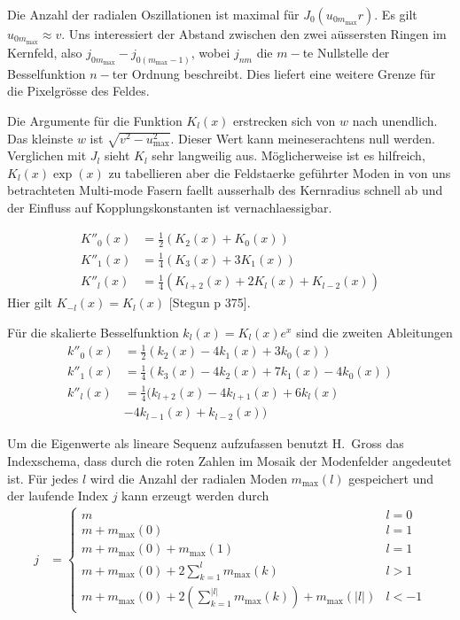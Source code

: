 \documentclass[DIV19,twocolumn]{scrartcl}
\def\({\left(}
\def\){\right)}
\newcommand{\mmax}{m_\textrm{max}}
\newcommand{\umax}{u_\textrm{max}}
\begin{document}
Die Anzahl der radialen Oszillationen ist maximal f\"ur $J_0(u_{0
  m_\textrm{max}} r)$.  Es gilt $u_{0 m_\textrm{max}} \approx v$. Uns
interessiert der Abstand zwischen den zwei a\"ussersten Ringen im
Kernfeld, also $j_{0m_\textrm{max}} - j_{0 (m_\textrm{max}-1)}$, wobei
$j_{nm}$ die $m-$te Nullstelle der Besselfunktion $n-$ter Ordnung
beschreibt.  Dies liefert eine weitere Grenze f\"ur die Pixelgr\"osse
des Feldes.

Die Argumente f\"ur die Funktion $K_l(x)$ erstrecken sich von $w$ nach
unendlich. Das kleinste $w$ ist $\sqrt{v^2-\umax^2}$. Dieser Wert kann
meineserachtens null werden. Verglichen mit $J_l$ sieht $K_l$ sehr
langweilig aus. M\"oglicherweise ist es hilfreich, $K_l(x)\exp(x)$ zu
tabellieren aber die Feldstaerke gef\"uhrter Moden in von uns
betrachteten Multi-mode Fasern faellt ausserhalb des Kernradius
schnell ab und der Einfluss auf Kopplungskonstanten ist
vernachlaessigbar.


\begin{align}
  K''_0(x) &= \frac{1}{2}\(K_2(x)+K_0(x)\)\\
  K''_1(x) &= \frac{1}{4}\(K_3(x)+3K_1(x)\)\\
  K''_l(x) &= \frac{1}{4}\(K_{l+2}(x)+2K_l(x)+K_{l-2}(x)\)
\end{align}
Hier gilt $K_{-l}(x) = K_l(x)$ [Stegun p 375]. 

F\"ur die skalierte Besselfunktion $k_l(x)=K_l(x)e^x$ sind die zweiten Ableitungen
\begin{align}
  k''_0(x) &= \frac{1}{2}\(k_2(x)-4k_1(x)+3k_0(x)\)\\
  k''_1(x) &= \frac{1}{4}\(k_3(x)-4k_2(x)+7k_1(x)-4k_0(x)\)\\
  k''_l(x) &= \frac{1}{4}\big(k_{l+2}(x)-4k_{l+1}(x)+6k_l(x) \nonumber \\ 
&  -4k_{l-1}(x)+k_{l-2}(x)\big)
\end{align}


Um die Eigenwerte als lineare Sequenz aufzufassen benutzt H.~Gross das
Indexschema, dass durch die roten Zahlen im Mosaik der Modenfelder
angedeutet ist. F\"ur jedes $l$ wird die Anzahl der radialen Moden
$\mmax(l)$ gespeichert und der laufende Index $j$ kann erzeugt werden
durch
\begin{align}
  j &= \begin{cases}
    m & l=0\\
    m+\mmax(0) & l=1\\
    m+\mmax(0)+\mmax(1) & l=1\\
    m+\mmax(0)+ 2\sum_{k=1}^l \mmax(k) & l>1 \\
    m+\mmax(0)+ 2\(\sum_{k=1}^{|l|} \mmax(k)\) + \mmax(|l|) & l<-1
\end{cases}
\end{align}
\end{document}
